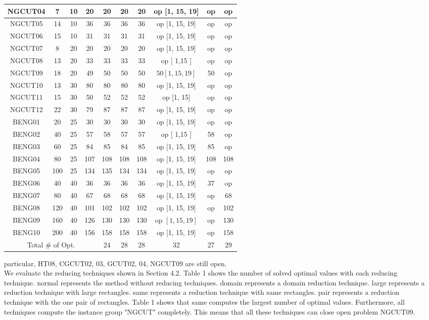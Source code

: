 \documentclass[10pt]{article}
\begin{document}
\begin{center}
\begin{tabular}{|c|c|c|c|c|c|c|c|c|c|}
\hline
NGCUT04 & 7 & 10 & 20 & 20 & 20 & 20 & op [1, 15, 19] & op & op \\
\hline
NGCUT05 & 14 & 10 & 36 & 36 & 36 & 36 & op [1, 15, 19] & op & op \\
\hline
NGCUT06 & 15 & 10 & 31 & 31 & 31 & 31 & op [1, 15, 19] & op & op \\
\hline
NGCUT07 & 8 & 20 & 20 & 20 & 20 & 20 & op [1, 15, 19] & op & op \\
\hline
NGCUT08 & 13 & 20 & 33 & 33 & 33 & 33 & op [ 1,15 ] & op & op \\
\hline
NGCUT09 & 18 & 20 & 49 & 50 & 50 & 50 & $50[1,15,19]$ & 50 & op \\
\hline
NGCUT10 & 13 & 30 & 80 & 80 & 80 & 80 & op [1, 15, 19] & op & op \\
\hline
NGCUT11 & 15 & 30 & 50 & 52 & 52 & 52 & op [1, 15] & op & op \\
\hline
NGCUT12 & 22 & 30 & 79 & 87 & 87 & 87 & op [1, 15, 19] & op & op \\
\hline
BENG01 & 20 & 25 & 30 & 30 & 30 & 30 & op [1, 15, 19] & op & op \\
\hline
BENG02 & 40 & 25 & 57 & 58 & 57 & 57 & op [ 1,15 ] & 58 & op \\
\hline
BENG03 & 60 & 25 & 84 & 85 & 84 & 85 & op [1, 15, 19] & 85 & op \\
\hline
BENG04 & 80 & 25 & 107 & 108 & 108 & 108 & op [1, 15, 19] & 108 & 108 \\
\hline
BENG05 & 100 & 25 & 134 & 135 & 134 & 134 & op [1, 15, 19] & op & op \\
\hline
BENG06 & 40 & 40 & 36 & 36 & 36 & 36 & op [1, 15, 19] & 37 & op \\
\hline
BENG07 & 80 & 40 & 67 & 68 & 68 & 68 & op [1, 15, 19] & op & 68 \\
\hline
BENG08 & 120 & 40 & 101 & 102 & 102 & 102 & op [1, 15, 19] & op & 102 \\
\hline
BENG09 & 160 & 40 & 126 & 130 & 130 & 130 & op $[1,15,19]$ & op & 130 \\
\hline
BENG10 & 200 & 40 & 156 & 158 & 158 & 158 & op [1, 15, 19] & op & 158 \\
\hline
\multicolumn{4}{|c|}{Total \# of Opt.} & 24 & 28 & 28 & 32 & 27 & 29 \\
\hline
\end{tabular}
\end{center}

particular, HT08, CGCUT02, 03, GCUT02, 04, NGCUT09 are still open.\\
We evaluate the reducing techniques shown in Section 4.2. Table 1 shows the number of solved optimal values with each reducing technique. normal represents the method without reducing techniques. domain represents a domain reduction technique. large represents a reduction technique with large rectangles. same represents a reduction technique with same rectangles. pair represents a reduction technique with the one pair of rectangles. Table 1 shows that same computes the largest number of optimal values. Furthermore, all techniques compute the instance group "NGCUT" completely. This means that all these techniques can close open problem NGCUT09.
\end{document}
